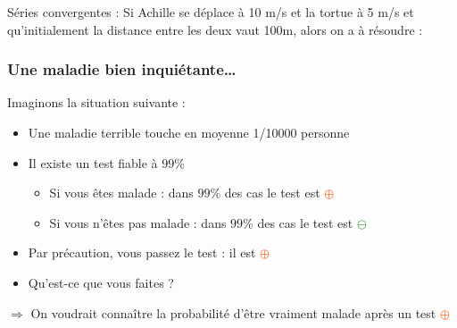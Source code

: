 \documentclass[usenames, dvipsnames, no-framenumber]{beamer}
\newcommand{\positif}{\textcolor{OrangeRed}{$\oplus$} }
\newcommand{\negatif}{\textcolor{ForestGreen}{$\ominus$} }
\begin{document}
\begin{frame}%
{Séries convergentes :}
Si Achille se déplace à 10 m/s et la tortue à 5 m/s et qu'initialement la distance entre les deux vaut 100m, alors on a à résoudre : 
{} %
{}
\end{frame}

\begin{frame}%
\frametitle{Une maladie bien inquiétante\dots}

Imaginons la situation suivante :

\begin{itemize}
\item Une maladie terrible touche en moyenne 1/10000 personne
\item Il existe un test fiable à $99\%$ \pause
\begin{itemize}
\item Si vous êtes malade : dans $99\%$ des cas le test est \positif
\item Si vous n'êtes pas malade : dans $99\%$ des cas le test est \negatif
\end{itemize}
\item Par précaution, vous passez le test : il est \positif \pause
\item Qu'est-ce que vous faites ? \pause
\end{itemize}

$\Rightarrow$ On voudrait connaître la probabilité d'être vraiment malade après un test \positif

\end{frame}
\end{document}
